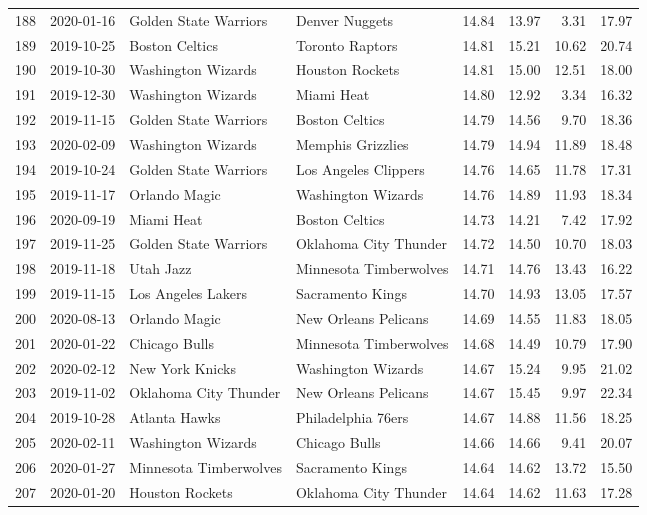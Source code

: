 \documentclass[
  11pt,
]{article}
\theoremstyle{nonumberplain}
\begin{document}
\begin{longtable}{rl|llr|rrr}
188 & 2020-01-16 & Golden State Warriors & Denver Nuggets & 14.84 & 13.97 & 3.31 & 17.97\\
189 & 2019-10-25 & Boston Celtics & Toronto Raptors & 14.81 & 15.21 & 10.62 & 20.74\\
190 & 2019-10-30 & Washington Wizards & Houston Rockets & 14.81 & 15.00 & 12.51 & 18.00\\
191 & 2019-12-30 & Washington Wizards & Miami Heat & 14.80 & 12.92 & 3.34 & 16.32\\
192 & 2019-11-15 & Golden State Warriors & Boston Celtics & 14.79 & 14.56 & 9.70 & 18.36\\
193 & 2020-02-09 & Washington Wizards & Memphis Grizzlies & 14.79 & 14.94 & 11.89 & 18.48\\
194 & 2019-10-24 & Golden State Warriors & Los Angeles Clippers & 14.76 & 14.65 & 11.78 & 17.31\\
195 & 2019-11-17 & Orlando Magic & Washington Wizards & 14.76 & 14.89 & 11.93 & 18.34\\
196 & 2020-09-19 & Miami Heat & Boston Celtics & 14.73 & 14.21 & 7.42 & 17.92\\
197 & 2019-11-25 & Golden State Warriors & Oklahoma City Thunder & 14.72 & 14.50 & 10.70 & 18.03\\
198 & 2019-11-18 & Utah Jazz & Minnesota Timberwolves & 14.71 & 14.76 & 13.43 & 16.22\\
199 & 2019-11-15 & Los Angeles Lakers & Sacramento Kings & 14.70 & 14.93 & 13.05 & 17.57\\
200 & 2020-08-13 & Orlando Magic & New Orleans Pelicans & 14.69 & 14.55 & 11.83 & 18.05\\
201 & 2020-01-22 & Chicago Bulls & Minnesota Timberwolves & 14.68 & 14.49 & 10.79 & 17.90\\
202 & 2020-02-12 & New York Knicks & Washington Wizards & 14.67 & 15.24 & 9.95 & 21.02\\
203 & 2019-11-02 & Oklahoma City Thunder & New Orleans Pelicans & 14.67 & 15.45 & 9.97 & 22.34\\
204 & 2019-10-28 & Atlanta Hawks & Philadelphia 76ers & 14.67 & 14.88 & 11.56 & 18.25\\
205 & 2020-02-11 & Washington Wizards & Chicago Bulls & 14.66 & 14.66 & 9.41 & 20.07\\
206 & 2020-01-27 & Minnesota Timberwolves & Sacramento Kings & 14.64 & 14.62 & 13.72 & 15.50\\
207 & 2020-01-20 & Houston Rockets & Oklahoma City Thunder & 14.64 & 14.62 & 11.63 & 17.28\\

\end{longtable}
\end{document}
